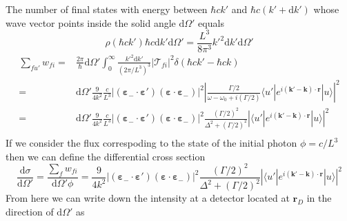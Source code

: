 \documentclass[11pt,letter]{article}
\newcommand{\bv}[1]{\ensuremath{\bm{#1}}}
\begin{document}
The number of final states with energy between $\hbar c k'$ and $\hbar c ( k' + \mathrm{d}k')$  whose wave vector points inside the solid angle $\mathrm{d} \Omega'$ equals 
\begin{equation}
    \rho( \hbar c k') \hbar c \mathrm{d} k' \mathrm{d} \Omega ' = \frac{L^{3}}{8 \pi^{3} }  k'^{2} \mathrm{d} k' \mathrm{d} \Omega' 
\end{equation} 
\begin{equation}
\begin{split}
  \sum_{fu'} w_{fi} = & 
   \frac{2\pi}{\hbar}  \mathrm{d} \Omega' 
      \int_{0}^{\infty} \frac{k'^{2} \mathrm{d} k' }{ (2\pi / L^{3} ) ^{3} } 
   | \mathcal{T}_{fi} |^{2} 
   \delta( \hbar c k' - \hbar c k )  \\ 
   = & 
   \mathrm{d} \Omega' \frac{9}{4 k^{2}} \frac{ c } {L^{3} }
        |(\bv{\varepsilon}_{-}\cdot \bv{\varepsilon}' )
                       (\bv{\varepsilon}\cdot \bv{\varepsilon}_{-} ) |^{2}
    \left|
    \frac{ \Gamma/2  }
        { \omega - \omega_{0} + i (\Gamma/2 ) }  
      \langle u' | e^{i(\bv{k}'-\bv{k}) \cdot\bv{r}} | u  \rangle
     \right| ^{2} \\ 
   = & 
   \mathrm{d} \Omega' \frac{9}{4 k^{2}} \frac{ c } {L^{3} }
        |(\bv{\varepsilon}_{-}\cdot \bv{\varepsilon}' )
                       (\bv{\varepsilon}\cdot \bv{\varepsilon}_{-} ) |^{2}
    \frac{ (\Gamma/2)^{2}  }
        { \Delta^{2} +  (\Gamma/2 )^{2} }
    \left|
      \langle u' | e^{i(\bv{k}'-\bv{k}) \cdot\bv{r}} | u  \rangle
\right| ^{2} \\ 
\end{split} 
\end{equation}
If we consider the flux correspoding to the state of the initial photon $\phi = c/L^{3}$ then we can define the differential cross section 
\begin{equation}
 \frac{ \mathrm{d} \sigma } { \mathrm{d} \Omega'} =  
    \frac{\sum_{f} w_{fi} } { \mathrm{d} \Omega' \phi} = 
    \frac{9}{4 k^{2}} 
        |(\bv{\varepsilon}_{-}\cdot \bv{\varepsilon}' )
                       (\bv{\varepsilon}\cdot \bv{\varepsilon}_{-} ) |^{2}
    \frac{ (\Gamma/2)^{2}  }
        { \Delta^{2} +  (\Gamma/2 )^{2} }
    \left|
      \langle u' | e^{i(\bv{k}'-\bv{k}) \cdot\bv{r}} | u  \rangle
\right| ^{2}  
\end{equation}
From here we can write down the intensity at a detector located at $\bv{r}_{D}$ in the direction of $\mathrm{d} \Omega'$ as 
\end{document}
